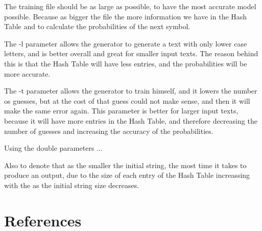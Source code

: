 \documentclass{article}
\begin{document}
The training file should be as large as possible, to have the most accurate model possible. Because as bigger the file the more 
information we have in the Hash Table and to calculate the probabilities of the next symbol.

The -l parameter allows the generator to generate a text with only lower case letters, and is better overall and great for smaller input texts. 
The reason behind this is that the Hash Table will have less entries, and the probabilities will be more accurate.

The -t parameter allows the generator to train himself, and it lowers the number os guesses, but at the cost of that guess could not make sense,
and then it will make the same error again. This parameter is better for larger input texts, because it will have more entries in the Hash Table,
and therefore decreasing the number of guesses and increasing the accuracy of the probabilities.

Using the double parameters ...

Also to denote that as the smaller the initial string, the most time it takes to produce an output, due to the size of each entry of 
the Hash Table increassing with the as the initial string size decreases. 


\section{References}


\end{document}
